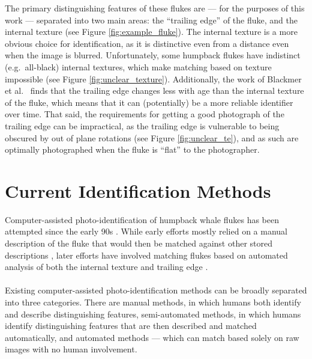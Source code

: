 The primary distinguishing features of these flukes are --- for the purposes of this work --- separated into two main areas: the ``trailing edge'' of the fluke, and the internal texture (see Figure \ref{fig:example_fluke}).
The internal texture is a more obvious choice for identification, as it is distinctive even from a distance even when the image is blurred.
Unfortunately, some humpback flukes have indistinct (e.g.\ all-black) internal textures, which make matching based on texture impossible (see Figure \ref{fig:unclear_texture}).
Additionally, the work of Blackmer et al.\ \cite{blackmer2000temporal} finds that the trailing edge changes less with age than the internal texture of the fluke, which means that it can (potentially) be a more reliable identifier over time.
That said, the requirements for getting a good photograph of the trailing edge can be impractical, as the trailing edge is vulnerable to being obscured by out of plane rotations (see Figure \ref{fig:unclear_te}), and as such are optimally photographed when the fluke is ``flat'' to the photographer.


\section{Current Identification Methods}

Computer-assisted photo-identification of humpback whale flukes has been attempted since the early 90s \cite{mizroch1990computer}.
While early efforts mostly relied on a manual description of the fluke that would then be matched against other stored descriptions \cite{mizroch1990computer, whitehead1990computer}, later efforts have involved matching flukes based on automated analysis of both the internal texture and trailing edge \cite{hughes2015automated, kniest2010fluke, i3scontour}.
\\\\
Existing computer-assisted photo-identification methods can be broadly separated into three categories.
There are manual methods, in which humans both identify and describe distinguishing features, semi-automated methods, in which humans identify distinguishing features that are then described and matched automatically, and automated methods --- which can match based solely on raw images with no human involvement. 


